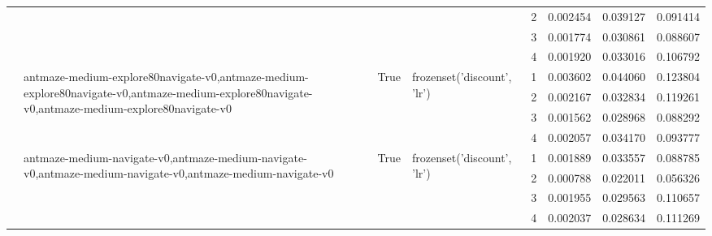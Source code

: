 \begin{tabular}{lllllrrr}
 &  &  &  & 2 & 0.002454 & 0.039127 & 0.091414 \\
 &  &  &  & 3 & 0.001774 & 0.030861 & 0.088607 \\
 &  &  &  & 4 & 0.001920 & 0.033016 & 0.106792 \\
\cline{2-8} \cline{3-8} \cline{4-8}
 & \multirow[t]{4}{*}{antmaze-medium-explore80navigate-v0,antmaze-medium-explore80navigate-v0,antmaze-medium-explore80navigate-v0,antmaze-medium-explore80navigate-v0} & \multirow[t]{4}{*}{True} & \multirow[t]{4}{*}{frozenset({'discount', 'lr'})} & 1 & 0.003602 & 0.044060 & 0.123804 \\
 &  &  &  & 2 & 0.002167 & 0.032834 & 0.119261 \\
 &  &  &  & 3 & 0.001562 & 0.028968 & 0.088292 \\
 &  &  &  & 4 & 0.002057 & 0.034170 & 0.093777 \\
\cline{2-8} \cline{3-8} \cline{4-8}
 & \multirow[t]{4}{*}{antmaze-medium-navigate-v0,antmaze-medium-navigate-v0,antmaze-medium-navigate-v0,antmaze-medium-navigate-v0} & \multirow[t]{4}{*}{True} & \multirow[t]{4}{*}{frozenset({'discount', 'lr'})} & 1 & 0.001889 & 0.033557 & 0.088785 \\
 &  &  &  & 2 & 0.000788 & 0.022011 & 0.056326 \\
 &  &  &  & 3 & 0.001955 & 0.029563 & 0.110657 \\
 &  &  &  & 4 & 0.002037 & 0.028634 & 0.111269 \\
\cline{1-8} \cline{2-8} \cline{3-8} \cline{4-8}
\bottomrule
\end{tabular}
